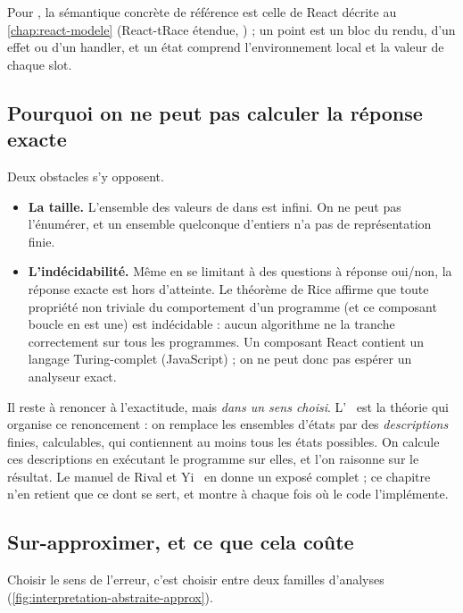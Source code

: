 Pour \reactant{}, la sémantique concrète de référence est celle de React
décrite au \cref{chap:react-modele} (React-tRace étendue, ) ; un
\og point\fg{} est un bloc du rendu, d'un effet ou d'un handler, et un état
comprend l'environnement local et la valeur de chaque slot.

\subsection{Pourquoi on ne peut pas calculer la réponse exacte}

Deux obstacles s'y opposent.

\begin{itemize}
  \item \textbf{La taille.} L'ensemble des valeurs de  dans
     est infini. On ne peut pas l'énumérer, et un ensemble quelconque
    d'entiers n'a pas de représentation finie.
  \item \textbf{L'indécidabilité.} Même en se limitant à des questions à
    réponse oui/non, la réponse exacte est hors d'atteinte. Le théorème de Rice
    affirme que toute propriété non triviale du comportement d'un programme
    (et \og ce composant boucle\fg{} en est une) est indécidable : aucun
    algorithme ne la tranche correctement sur tous les programmes. Un
    composant React contient un langage Turing-complet (JavaScript) ; on ne
    peut donc pas espérer un analyseur exact.
\end{itemize}

Il reste à renoncer à l'exactitude, mais \emph{dans un sens choisi}.
L'~\cite{CousotCousot77,CousotCousot79} est la
théorie qui organise ce renoncement : on remplace les ensembles d'états par des
\emph{descriptions} finies, calculables, qui contiennent au moins tous les états
possibles. On calcule ces descriptions en \og exécutant\fg{} le programme sur
elles, et l'on raisonne sur le résultat. Le manuel de Rival et
Yi~\cite{RivalYi2020} en donne un exposé complet ; ce chapitre n'en retient que
ce dont \reactant{} se sert, et montre à chaque fois où le code l'implémente.

\subsection{Sur-approximer, et ce que cela coûte}

Choisir le \og sens\fg{} de l'erreur, c'est choisir entre deux familles
d'analyses (\cref{fig:interpretation-abstraite-approx}).

